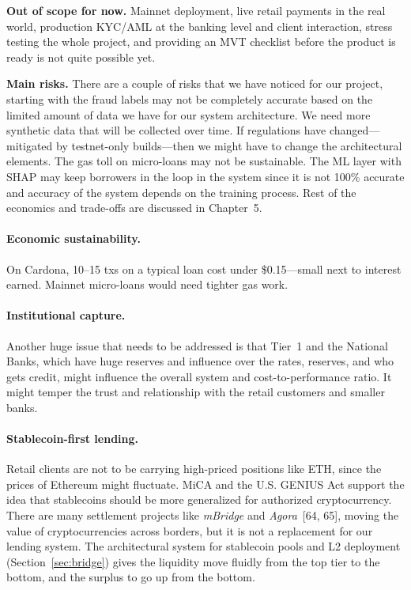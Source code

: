 \documentclass[12pt, a4paper]{report}
\begin{document}
\textbf{Out of scope for now.} Mainnet deployment, live retail payments in the real world, production KYC/AML at the banking level and client interaction, stress testing the whole project, and providing an MVT checklist before the product is ready is not quite possible yet.

\textbf{Main risks.} There are a couple of risks that we have noticed for our project, starting with the fraud labels may not be completely accurate based on the limited amount of data we have for our system architecture. We need more synthetic data that will be collected over time. If regulations have changed---mitigated by testnet-only builds---then we might have to change the architectural elements. The gas toll on micro-loans may not be sustainable. The ML layer with SHAP may keep borrowers in the loop in the system since it is not 100\% accurate and accuracy of the system depends on the training process. Rest of the economics and trade-offs are discussed in Chapter~5.

\paragraph{Economic sustainability.} On Cardona, 10--15 txs on a typical loan cost under \$0.15---small next to interest earned. Mainnet micro-loans would need tighter gas work.

\paragraph{Institutional capture.} Another huge issue that needs to be addressed is that Tier~1 and the National Banks, which have huge reserves and influence over the rates, reserves, and who gets credit, might influence the overall system and cost-to-performance ratio. It might temper the trust and relationship with the retail customers and smaller banks.

\paragraph{Stablecoin-first lending.}
\label{sec:stablecoin-first}
Retail clients are not to be carrying high-priced positions like ETH, since the prices of Ethereum might fluctuate. MiCA and the U.S. GENIUS Act support the idea that stablecoins should be more generalized for authorized cryptocurrency. There are many settlement projects like \textit{mBridge} and \textit{Agora}~[64, 65], moving the value of cryptocurrencies across borders, but it is not a replacement for our lending system. The architectural system for stablecoin pools and L2 deployment (Section~\ref{sec:bridge}) gives the liquidity move fluidly from the top tier to the bottom, and the surplus to go up from the bottom.
\end{document}
